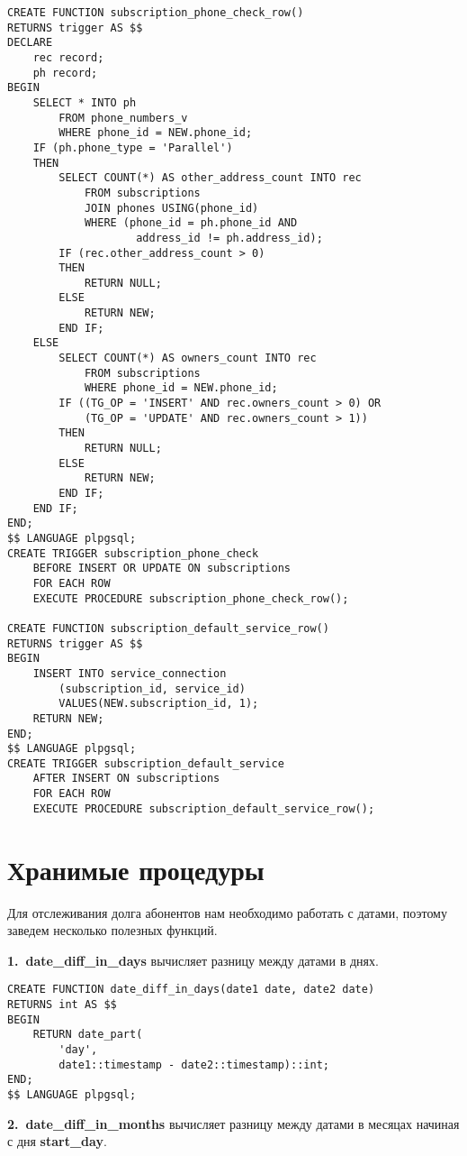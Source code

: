 \documentclass{report}
\begin{document}
\begin{lstlisting}
CREATE FUNCTION subscription_phone_check_row()
RETURNS trigger AS $$
DECLARE
    rec record;
    ph record;
BEGIN
    SELECT * INTO ph 
        FROM phone_numbers_v 
        WHERE phone_id = NEW.phone_id;
    IF (ph.phone_type = 'Parallel')
    THEN
        SELECT COUNT(*) AS other_address_count INTO rec 
            FROM subscriptions 
            JOIN phones USING(phone_id)
            WHERE (phone_id = ph.phone_id AND 
                    address_id != ph.address_id);
        IF (rec.other_address_count > 0)
        THEN 
            RETURN NULL;
        ELSE 
            RETURN NEW;
        END IF;
    ELSE
        SELECT COUNT(*) AS owners_count INTO rec 
            FROM subscriptions 
            WHERE phone_id = NEW.phone_id;
        IF ((TG_OP = 'INSERT' AND rec.owners_count > 0) OR 
            (TG_OP = 'UPDATE' AND rec.owners_count > 1))
        THEN 
            RETURN NULL;
        ELSE 
            RETURN NEW;
        END IF;
    END IF;
END;
$$ LANGUAGE plpgsql;
CREATE TRIGGER subscription_phone_check 
    BEFORE INSERT OR UPDATE ON subscriptions
    FOR EACH ROW 
    EXECUTE PROCEDURE subscription_phone_check_row();

CREATE FUNCTION subscription_default_service_row()
RETURNS trigger AS $$
BEGIN
    INSERT INTO service_connection 
        (subscription_id, service_id)
        VALUES(NEW.subscription_id, 1);
    RETURN NEW;
END;
$$ LANGUAGE plpgsql;
CREATE TRIGGER subscription_default_service
    AFTER INSERT ON subscriptions
    FOR EACH ROW 
    EXECUTE PROCEDURE subscription_default_service_row();
\end{lstlisting}

\section{Хранимые процедуры}

Для отслеживания долга абонентов нам необходимо
работать с датами, поэтому заведем несколько 
полезных функций.

\textbf{1.\ date\_diff\_in\_days} вычисляет разницу между 
датами в днях. 

\begin{lstlisting} 
CREATE FUNCTION date_diff_in_days(date1 date, date2 date)
RETURNS int AS $$
BEGIN
    RETURN date_part(
        'day', 
        date1::timestamp - date2::timestamp)::int;
END;
$$ LANGUAGE plpgsql;
\end{lstlisting}

\textbf{2.\ date\_diff\_in\_months} вычисляет разницу между 
датами в месяцах начиная с дня \textbf{start\_day}. 
\end{document}
